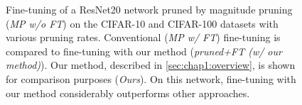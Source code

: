 \begin{figure}
  \centering
    \caption{ Fine-tuning of a ResNet20 network pruned by magnitude pruning
    (\emph{MP w/o FT}) on the CIFAR-10 and CIFAR-100 datasets with various
    pruning rates. Conventional (\emph{MP w/ FT}) fine-tuning is compared to
    fine-tuning with our method (\emph{pruned+FT (w/ our method)}). Our method,
    described in \cref{sec:chap1:overview}, is shown for comparison purposes
    (\emph{Ours}). On this network, fine-tuning with our method considerably
    outperforms other approaches.}
  \label{fig:chap1:finetuning_impact_resnet20}
\end{figure}


